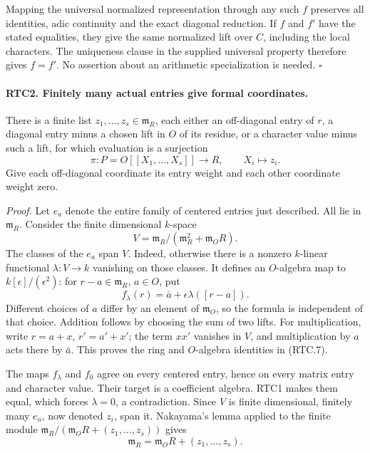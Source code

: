 \documentclass[11pt,a4paper]{article}
\numberwithin{equation}{section}
\theoremstyle{remark}\newtheorem{remark}[theorem]{Remark}
\begin{document}
Mapping the universal normalized representation through any such
\(f\) preserves all identities, adic continuity and the exact
diagonal reduction.  If \(f\) and \(f'\) have the stated equalities,
they give the same normalized lift over \(C\), including the local
characters.  The uniqueness clause in the supplied universal property
therefore gives \(f=f'\).  No assertion about an arithmetic
specialization is needed. \hfill\(\square\)

\paragraph{RTC2. Finitely many actual entries give formal coordinates.}
\label{claim:RTC2}
There is a finite list \(z_1,\ldots,z_s\in\mathfrak m_R\), each
either an off-diagonal entry of \(r\), a diagonal entry minus a
chosen lift in \(O\) of its residue, or a character value minus
such a lift, for which evaluation is a surjection
\[
 \pi:P=O[[X_1,\ldots,X_s]]\longrightarrow R,
       \qquad X_i\longmapsto z_i.
                                                        \tag{RTC.6}
\]
Give each off-diagonal coordinate its entry weight and each other
coordinate weight zero.

\emph{Proof.}
Let \(e_a\) denote the entire family of centered entries just
described.  All lie in \(\mathfrak m_R\).  Consider the finite
dimensional \(k\)-space
\[
 V=\mathfrak m_R/(\mathfrak m_R^2+\mathfrak m_OR).
\]
The classes of the \(e_a\) span \(V\).  Indeed, otherwise there
is a nonzero \(k\)-linear functional \(\lambda:V\to k\)
vanishing on those classes.  It defines an \(O\)-algebra map to
\(k[\epsilon]/(\epsilon^2)\): for \(r-a\in\mathfrak m_R\),
\(a\in O\), put
\[
 f_\lambda(r)=\bar a+\epsilon\lambda([r-a]).
                                                        \tag{RTC.7}
\]
Different choices of \(a\) differ by an element of
\(\mathfrak m_O\), so the formula is independent of that choice.
Addition follows by choosing the sum of two lifts.  For multiplication,
write \(r=a+x\), \(r'=a'+x'\); the term \(xx'\) vanishes in
\(V\), and multiplication by \(a\) acts there by \(\bar a\).
This proves the ring and \(O\)-algebra identities in (RTC.7).

The maps \(f_\lambda\) and \(f_0\) agree on every centered entry,
hence on every matrix entry and character value.  Their target is a
coefficient algebra.  RTC1 makes them equal, which forces
\(\lambda=0\), a contradiction.  Since \(V\) is finite
dimensional, finitely many \(e_a\), now denoted \(z_i\), span it.
Nakayama's lemma applied to the finite module
\(\mathfrak m_R/(\mathfrak m_OR+(z_1,\ldots,z_s))\) gives
\[
 \mathfrak m_R=\mathfrak m_OR+(z_1,\ldots,z_s).
                                                        \tag{RTC.8}
\]
\end{document}
